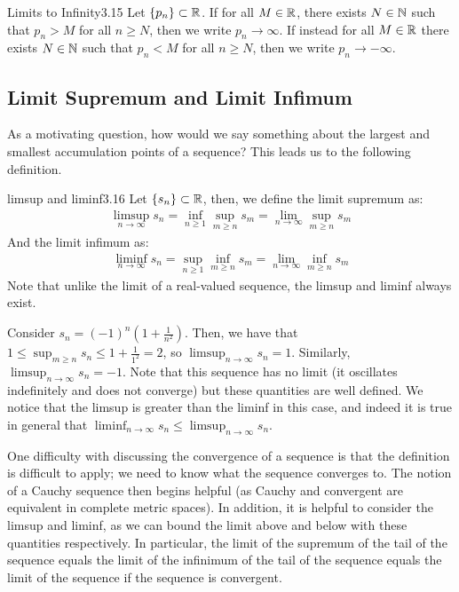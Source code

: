 \begin{definition}{Limits to Infinity}{3.15}
    Let $\set{p_n} \subset \mathbb{R}$. If for all $M \in \mathbb{R}$, there exists $N \in \mathbb{N}$ such that $p_n > M$ for all $n \geq N$, then we write $p_n \rightarrow \infty$. If instead for all $M \in \mathbb{R}$ there exists $N \in \mathbb{N}$ such that $p_n < M$ for all $n \geq N$, then we write $p_n \rightarrow -\infty$.
\end{definition}



\subsection{Limit Supremum and Limit Infimum}
As a motivating question, how would we say something about the largest and smallest accumulation points of a sequence? This leads us to the following definition.
\begin{definition}{limsup and liminf}{3.16}
    Let $\set{s_n} \subset \mathbb{R}$, then, we define the limit supremum as:
    \begin{align*}
        \limsup_{n \rightarrow \infty} s_n = \inf_{n \geq 1}\sup_{m \geq n} s_m = \lim_{n \rightarrow \infty} \sup_{m \geq n} s_m
    \end{align*}
    And the limit infimum as:
    \begin{align*}
        \liminf_{n \rightarrow \infty} s_n = \sup_{n \geq 1}\inf_{m \geq n} s_m = \lim_{n \rightarrow \infty} \inf_{m \geq n} s_m
    \end{align*}
    Note that unlike the limit of a real-valued sequence, the limsup and liminf always exist.
\end{definition}

\begin{nexample}{}{}
    Consider $s_n = (-1)^n\left(1 + \frac{1}{n^2}\right)$. Then, we have that $1 \leq \sup_{m \geq n} s_n \leq 1 + \frac{1}{1^2} = 2$, so $\limsup_{n \rightarrow \infty} s_n = 1$. Similarly, $\limsup_{n \rightarrow \infty} s_n = -1$. Note that this sequence has no limit (it oscillates indefinitely and does not converge) but these quantities are well defined. We notice that the limsup is greater than the liminf in this case, and indeed it is true in general that $\liminf_{n \rightarrow \infty} s_n \leq \limsup_{n \rightarrow \infty} s_n$. 
\end{nexample}

\noindent One difficulty with discussing the convergence of a sequence is that the definition is difficult to apply; we need to know what the sequence converges to. The notion of a Cauchy sequence then begins helpful (as Cauchy and convergent are equivalent in complete metric spaces). In addition, it is helpful to consider the limsup and liminf, as we can bound the limit above and below with these quantities respectively. In particular, the limit of the supremum of the tail of the sequence equals the limit of the infinimum of the tail of the sequence equals the limit of the sequence if the sequence is convergent.

